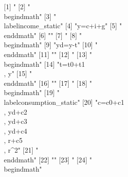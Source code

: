  [1] "%
 [2] "\\begin{dmath}"                                                             
 [3] "\\label{income_static}"                                                     
 [4] "{y}={c}+{i}+{g}"                                                            
 [5] "\\end{dmath}"                                                               
 [6] ""                                                                           
 [7] "%
 [8] "\\begin{dmath}"                                                             
 [9] "{yd}={y}-{t}"                                                               
[10] "\\end{dmath}"                                                               
[11] ""                                                                           
[12] "%
[13] "\\begin{dmath}"                                                             
[14] "{t}={t0}+{t1}\\, {y}"                                                       
[15] "\\end{dmath}"                                                               
[16] ""                                                                           
[17] "%
[18] "\\begin{dmath}"                                                             
[19] "\\label{consumption_static}"                                                
[20] "{c}={c0}+{c1}\\, {yd}+{c2}\\, {yd}+{c3}\\, {yd}+{c4}\\, {r}+{c5}\\, {r}^{2}"
[21] "\\end{dmath}"                                                               
[22] ""                                                                           
[23] "%
[24] "\\begin{dmath}"                                                             

